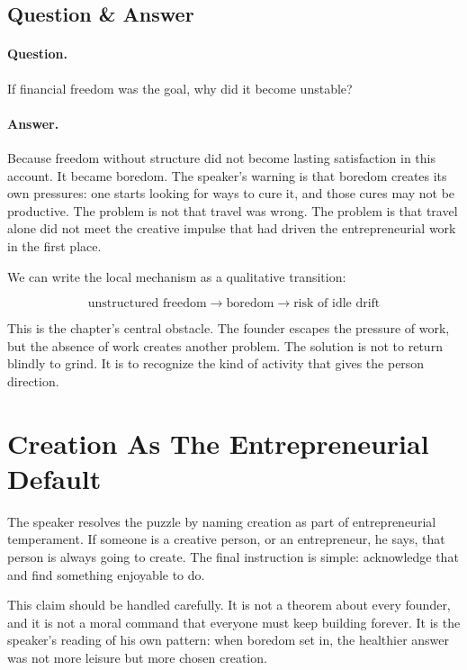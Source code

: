 \subsection{Question \& Answer}

\paragraph{Question.}
If financial freedom was the goal, why did it become unstable?

\paragraph{Answer.}
Because freedom without structure did not become lasting satisfaction in this account. It became boredom. The speaker's warning is that boredom creates its own pressures: one starts looking for ways to cure it, and those cures may not be productive. The problem is not that travel was wrong. The problem is that travel alone did not meet the creative impulse that had driven the entrepreneurial work in the first place.

We can write the local mechanism as a qualitative transition:

\begin{equation}
\text{unstructured freedom}
\longrightarrow
\text{boredom}
\longrightarrow
\text{risk of idle drift}
\end{equation}

This is the chapter's central obstacle. The founder escapes the pressure of work, but the absence of work creates another problem. The solution is not to return blindly to grind. It is to recognize the kind of activity that gives the person direction.

\section{Creation As The Entrepreneurial Default}

The speaker resolves the puzzle by naming creation as part of entrepreneurial temperament. If someone is a creative person, or an entrepreneur, he says, that person is always going to create. The final instruction is simple: acknowledge that and find something enjoyable to do.

This claim should be handled carefully. It is not a theorem about every founder, and it is not a moral command that everyone must keep building forever. It is the speaker's reading of his own pattern: when boredom set in, the healthier answer was not more leisure but more chosen creation.


